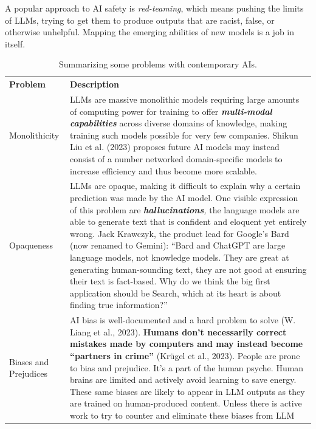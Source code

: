 \documentclass[
  12pt,
  letterpaper,
  DIV=11,
  numbers=noendperiod]{scrartcl}
\begin{document}
A popular approach to AI safety is \emph{red-teaming}, which means
pushing the limits of LLMs, trying to get them to produce outputs that
are racist, false, or otherwise unhelpful. Mapping the emerging
abilities of new models is a job in itself.

\def\pandoctableshortcapt{Problems with contemporary AIs}

\begin{longtable}[]{@{}
  >{\raggedright\arraybackslash}p{}
  >{\raggedright\arraybackslash}p{}@{}}
\caption[Problems with contemporary AIs]{Summarizing some problems with
contemporary AIs.}\tabularnewline
\toprule\noalign{}
\endfirsthead
\endhead
\bottomrule\noalign{}
\endlastfoot
\textbf{Problem} & \textbf{Description} \\
Monolithicity & LLMs are massive monolithic models requiring large
amounts of computing power for training to offer
\textbf{\emph{multi-modal}} \textbf{\emph{capabilities}} across diverse
domains of knowledge, making training such models possible for very few
companies. Shikun Liu et al. (2023) proposes future AI models may
instead consist of a number networked domain-specific models to increase
efficiency and thus become more scalable. \\
Opaqueness & LLMs are opaque, making it difficult to explain why a
certain prediction was made by the AI model. One visible expression of
this problem are \emph{\textbf{hallucinations},} the language models are
able to generate text that is confident and eloquent yet entirely wrong.
Jack Krawczyk, the product lead for Google's Bard (now renamed to
Gemini): ``Bard and ChatGPT are large language models, not knowledge
models. They are great at generating human-sounding text, they are not
good at ensuring their text is fact-based. Why do we think the big first
application should be Search, which at its heart is about finding true
information?'' \\
Biases and Prejudices & AI bias is well-documented and a hard problem to
solve (W. Liang et al., 2023). \textbf{Humans don't necessarily correct
mistakes made by computers and may instead become ``partners in crime''}
(Krügel et al., 2023). People are prone to bias and prejudice. It's a
part of the human psyche. Human brains are limited and actively avoid
learning to save energy. These same biases are likely to appear in LLM
outputs as they are trained on human-produced content. Unless there is
active work to try to counter and eliminate these biases from LLM

\end{longtable}
\end{document}
